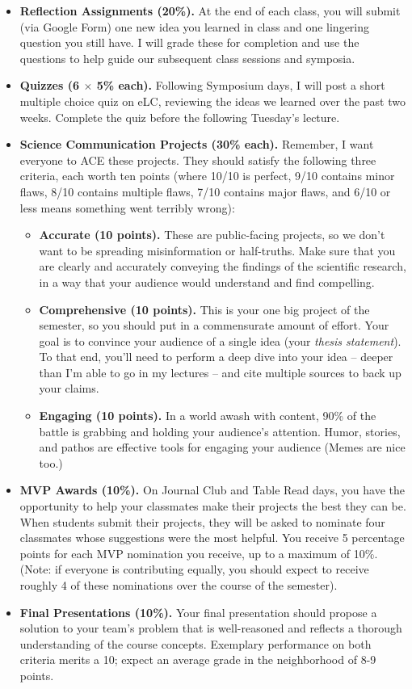 \documentclass[11pt, letterpaper]{article}
\begin{document}
\begin{itemize}
	\item \textbf{Reflection Assignments (20\%).} At the end of each class, you will submit (via Google Form) one new idea you learned in class and one lingering question you still have. I will grade these for completion and use the questions to help guide our subsequent class sessions and symposia.
	\item \textbf{Quizzes (6 $\times$ 5\% each).} Following Symposium days, I will post a short multiple choice quiz on eLC, reviewing the ideas we learned over the past two weeks. Complete the quiz before the following Tuesday's lecture.
	\item \textbf{Science Communication Projects (30\% each).} Remember, I want everyone to ACE these projects. They should satisfy the following three criteria, each worth ten points (where 10/10 is perfect, 9/10 contains minor flaws, 8/10 contains multiple flaws, 7/10 contains major flaws, and 6/10 or less means something went terribly wrong):
		\begin{itemize}
			\item \textbf{Accurate (10 points).} These are public-facing projects, so we don't want to be spreading misinformation or half-truths. Make sure that you are clearly and accurately conveying the findings of the scientific research, in a way that your audience would understand and find compelling.
			\item \textbf{Comprehensive (10 points).} This is your one big project of the semester, so you should put in a commensurate amount of effort. Your goal is to convince your audience of a single idea (your \textit{thesis statement}). To that end, you'll need to perform a deep dive into your idea -- deeper than I'm able to go in my lectures -- and cite multiple sources to back up your claims. 
			\item \textbf{Engaging (10 points).} In a world awash with content, 90\% of the battle is grabbing and holding your audience's attention. Humor, stories, and pathos are effective tools for engaging your audience (Memes are nice too.)
		\end{itemize}
	\item \textbf{MVP Awards (10\%).} On Journal Club and Table Read days, you have the opportunity to help your classmates make their projects the best they can be. When students submit their projects, they will be asked to nominate four classmates whose suggestions were the most helpful. You receive 5 percentage points for each MVP nomination you receive, up to a maximum of 10\%. (Note: if everyone is contributing equally, you should expect to receive roughly 4 of these nominations over the course of the semester).
	\item \textbf{Final Presentations (10\%).} Your final presentation should propose a solution to your team's problem that is well-reasoned and reflects a thorough understanding of the course concepts. Exemplary performance on both criteria merits a 10; expect an average grade in the neighborhood of 8-9 points.
\end{itemize}
\end{document}
